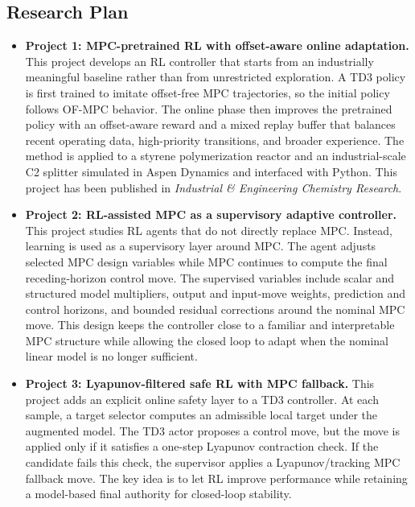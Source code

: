 \documentclass[10pt]{article}
\newcommand{\ResearchPlan}{\subsection*{Research Plan}}
\begin{document}
\ResearchPlan

\begin{itemize}
    \item \textbf{Project 1: MPC-pretrained RL with offset-aware online adaptation.}
    This project develops an RL controller that starts from an industrially meaningful baseline rather than from unrestricted exploration. A TD3 policy is first trained to imitate offset-free MPC trajectories, so the initial policy follows OF-MPC behavior. The online phase then improves the pretrained policy with an offset-aware reward and a mixed replay buffer that balances recent operating data, high-priority transitions, and broader experience. The method is applied to a styrene polymerization reactor and an industrial-scale C2 splitter simulated in Aspen Dynamics and interfaced with Python. This project has been published in \emph{Industrial \& Engineering Chemistry Research}.

    \item \textbf{Project 2: RL-assisted MPC as a supervisory adaptive controller.}
    This project studies RL agents that do not directly replace MPC. Instead, learning is used as a supervisory layer around MPC. The agent adjusts selected MPC design variables while MPC continues to compute the final receding-horizon control move. The supervised variables include scalar and structured model multipliers, output and input-move weights, prediction and control horizons, and bounded residual corrections around the nominal MPC move. This design keeps the controller close to a familiar and interpretable MPC structure while allowing the closed loop to adapt when the nominal linear model is no longer sufficient.

    \item \textbf{Project 3: Lyapunov-filtered safe RL with MPC fallback.}
    This project adds an explicit online safety layer to a TD3 controller. At each sample, a target selector computes an admissible local target under the augmented model. The TD3 actor proposes a control move, but the move is applied only if it satisfies a one-step Lyapunov contraction check. If the candidate fails this check, the supervisor applies a Lyapunov/tracking MPC fallback move. The key idea is to let RL improve performance while retaining a model-based final authority for closed-loop stability.
\end{itemize}
\end{document}
